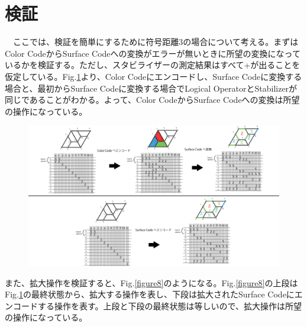 \documentclass[a4paper,9pt]{ltjsarticle}
\begin{document}
\section{検証}{
    　ここでは、検証を簡単にするために符号距離3の場合について考える。まずはColor CodeからSurface Codeへの変換がエラーが無いときに所望の変換になっているかを検証する。ただし、スタビライザーの測定結果はすべて+が出ることを仮定している。Fig.\ref{figure7}より、Color Codeにエンコードし、Surface Codeに変換する場合と、最初からSurface Codeに変換する場合でLogical OperatorとStabilizerが同じであることがわかる。よって、Color CodeからSurface Codeへの変換は所望の操作になっている。

    \begin{figure}[h]
        \centering
        \includegraphics[scale=0.30]{figure/figure7.eps}
        \vspace{10pt}\caption{}
        \label{figure7}
        \vspace{-15pt}
    \end{figure}

    また、拡大操作を検証すると、Fig.\ref{figure8}のようになる。Fig.\ref{figure8}の上段はFig.\ref{figure7}の最終状態から、拡大する操作を表し、下段は拡大されたSurface Codeにエンコードする操作を表す。上段と下段の最終状態は等しいので、拡大操作は所望の操作になっている。

}
\end{document}
